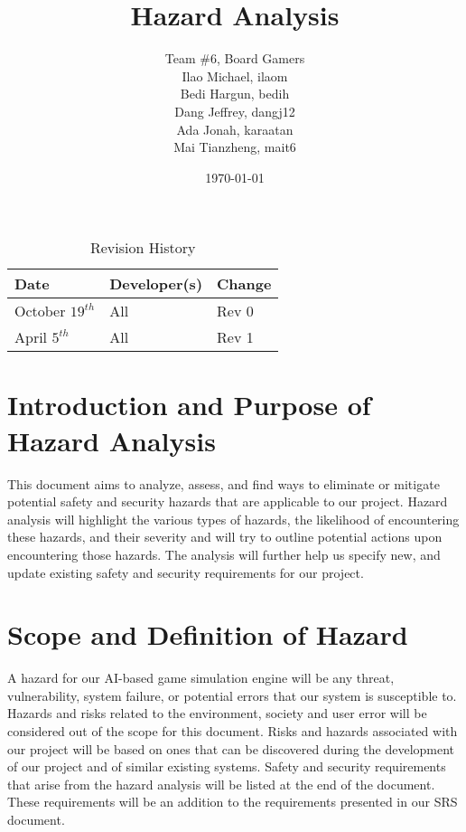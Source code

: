 \documentclass{article}
\title{Hazard Analysis\\}
\author{Team \#6, Board Gamers
\\ Ilao Michael, ilaom
\\ Bedi Hargun, bedih
\\ Dang Jeffrey, dangj12
\\ Ada Jonah, karaatan
\\ Mai Tianzheng, mait6}
\date{\today}
\begin{document}
\tableofcontents

\listoftables
\newpage

\begin{table}[hp]
\caption{Revision History} \label{TblRevisionHistory}
\begin{tabularx}{\textwidth}{llX}
\toprule
\textbf{Date} & \textbf{Developer(s)} & \textbf{Change}\\
\midrule
October $19^{th}$ & All & Rev 0\\
April $5^{th}$ & All & Rev 1\\
\bottomrule
\end{tabularx}
\end{table}

\newpage

\maketitle

\section{Introduction and Purpose of Hazard Analysis}
This document aims to analyze, assess, and find ways to eliminate or mitigate potential safety and security hazards that are applicable to our project. Hazard analysis will highlight the various types of hazards, the likelihood of encountering these hazards, and their severity and will try to outline potential actions upon encountering those hazards. The analysis will further help us specify new, and update existing safety and security requirements for our project. 

\section{Scope and Definition of Hazard}
A hazard for our AI-based game simulation engine will be any threat, vulnerability, system failure, or potential errors that our system is susceptible to. Hazards and risks related to the environment, society and user error will be considered out of the scope for this document. Risks and hazards associated with our project will be based on ones that can be discovered during the development of our project and of similar existing systems. Safety and security requirements that arise from the hazard analysis will be listed at the end of the document. These requirements will be an addition to the requirements presented in our SRS document. 
\end{document}
